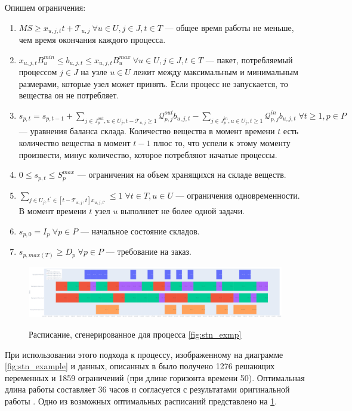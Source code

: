 \documentclass[12pt, twoside]{article}
\theoremstyle{definition}
\newcommand{\Tau}{\mathcal{T}}
\begin{document}
Опишем ограничения:

\begin{enumerate}
	\item $MS \geq x_{u, j, t}t + \Tau_{u, j} \: \forall u \in U, j \in J, t \in T$ --- общее время работы не меньше, чем время окончания каждого процесса.
	\item $x_{u, j, t}B^{min}_u \leq b_{u, j, t} \leq x_{u, j, t}B^{max}_u \: \forall u \in U, j \in J, t \in T$ --- пакет, потребляемый процессом $j \in J$ на узле $u \in U$ лежит между максимальным и минимальным размерами, которые узел может принять. Если процесс не запускается, то вещества он не потребляет.
	\item $s_{p, t} = s_{p, t-1} + \displaystyle\sum_{j \in J^{out}_p, u \in U_j, t - \Tau_{u, j} \geq 1} \mathcal{Q}^{out}_{p, j}b_{u, j, t} - \displaystyle\sum_{j \in J^{in}_p, u \in U_j, t \geq 1} \mathcal{Q}^{in}_{p, j}b_{u, j, t} \; \forall t \geq 1, p \in P$ --- уравнения баланса склада. Количество вещества в момент времени $t$ есть количество вещества в момент $t-1$ плюс то, что успели к этому моменту произвести, минус количество, которое потребляют начатые процессы.
	\item $0 \leq s_{p, t} \leq S^{max}_p$ --- ограничения на объем хранящихся на складе веществ.
	\item $\displaystyle\sum_{j \in U_j, t^{'} \in [t-\Tau_{u, j}, t] x_{u, j, t'}} \leq 1 \; \forall t \in T, u \in U$ --- ограничения одновременности. В момент времени $t$ узел $u$ выполняет не более одной задачи.
	\item $s_{p, 0} = I_p \; \forall p \in P$ --- начальное состояние складов.
	\item $s_{p, max(T)} \geq D_p \; \forall p \in P$ --- требование на заказ.
\end{enumerate}

\begin{figure}[h]
\caption{Расписание, сгенерированное для процесса \ref{fig:stn_exmp}}
\centering
\includegraphics[width=1.0\textwidth]{simpleplan}
\label{fig:simpleplan}
\end{figure}

При использовании этого подхода к процессу, изображенному на диаграмме \ref{fig:stn_example} и данных, описанных в \cite{discretetime} было получено 1276 решающих переменных и 1859 ограничений (при длине горизонта времени 50). Оптимальная длина работы составляет 36 часов и согласуется с результатами оригинальной работы \cite{discretetime}. Одно из возможных оптимальных расписаний представлено на \ref{fig:simpleplan}.
\end{document}
